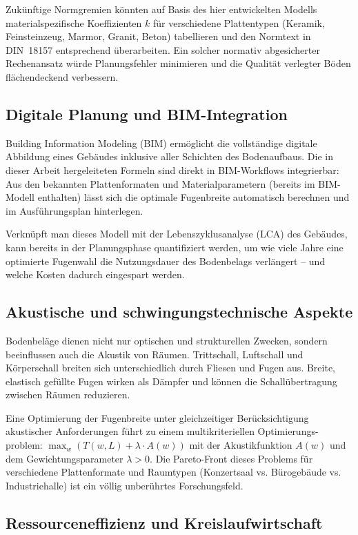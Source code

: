 ﻿\documentclass[a4paper,12pt]{article}
\theoremstyle{definition}
\begin{document}
Zukünftige Normgremien könnten auf Basis des hier entwickelten Modells
materialspezifische Koeffizienten $k$ für verschiedene Plattentypen
(Keramik, Feinsteinzeug, Marmor, Granit, Beton) tabellieren und
den Normtext in DIN~18157 entsprechend überarbeiten. Ein solcher
normativ abgesicherter Rechenansatz würde Planungsfehler minimieren
und die Qualität verlegter Böden flächendeckend verbessern.

\subsection{Digitale Planung und BIM-Integration}

Building Information Modeling (BIM) ermöglicht die vollständige
digitale Abbildung eines Gebäudes inklusive aller Schichten des
Bodenaufbaus. Die in dieser Arbeit hergeleiteten Formeln sind
direkt in BIM-Workflows integrierbar: Aus den bekannten Plattenformaten
und Materialparametern (bereits im BIM-Modell enthalten) lässt sich
die optimale Fugenbreite automatisch berechnen und im Ausführungsplan
hinterlegen.

Verknüpft man dieses Modell mit der Lebenszyklusanalyse (LCA)
des Gebäudes, kann bereits in der Planungsphase quantifiziert werden,
um wie viele Jahre eine optimierte Fugenwahl die Nutzungsdauer
des Bodenbelags verlängert -- und welche Kosten dadurch eingespart werden.

\subsection{Akustische und schwingungstechnische Aspekte}

Bodenbeläge dienen nicht nur optischen und strukturellen Zwecken,
sondern beeinflussen auch die Akustik von Räumen. Trittschall,
Luftschall und Körperschall breiten sich unterschiedlich durch
Fliesen und Fugen aus. Breite, elastisch gefüllte Fugen wirken
als Dämpfer und können die Schallübertragung zwischen Räumen reduzieren.

Eine Optimierung der Fugenbreite unter gleichzeitiger Berücksichtigung
akustischer Anforderungen führt zu einem multikriteriellen Optimierungs-
problem: $\max_w (T(w, L) + \lambda \cdot A(w))$ mit der Akustikfunktion
$A(w)$ und dem Gewichtungsparameter $\lambda > 0$.
Die Pareto-Front dieses Problems für verschiedene Plattenformate
und Raumtypen (Konzertsaal vs. Bürogebäude vs. Industriehalle)
ist ein völlig unberührtes Forschungsfeld.

\subsection{Ressourceneffizienz und Kreislaufwirtschaft}
\end{document}

